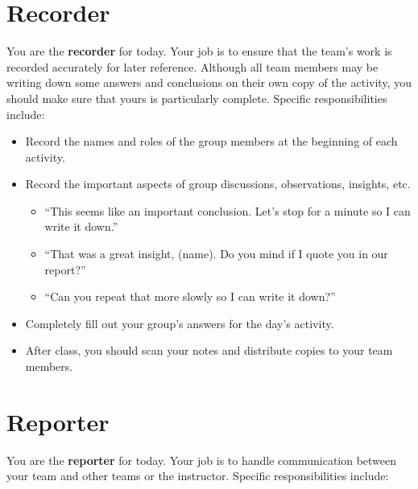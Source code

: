 \documentclass[12pt]{article}
\begin{document}
\newpage
\section*{Recorder}

You are the \textbf{recorder} for today. Your job is to ensure that
the team's work is recorded accurately for later reference. Although
all team members may be writing down some answers and conclusions on
their own copy of the activity, you should make sure that yours is
particularly complete.  Specific responsibilities include:

\begin{itemize}
\item Record the names and roles of the group members at the
  beginning of each activity.
\item Record the important aspects of group discussions, observations,
  insights, etc.
  \begin{itemize}
  \item ``This seems like an important conclusion. Let's stop
    for a minute so I can write it down.''
  \item ``That was a great insight, (name). Do you mind if I quote you
    in our report?''
  \item ``Can you repeat that more slowly so I can write it down?''
  \end{itemize}
\item Completely fill out your group's answers for the day's activity.
\item After class, you should scan your notes and distribute copies to
  your team members.
\end{itemize}

\newpage
\section*{Reporter}

You are the \textbf{reporter} for today.  Your job is to handle
communication between your team and other teams or the instructor.
Specific responsibilities include:
\end{document}
